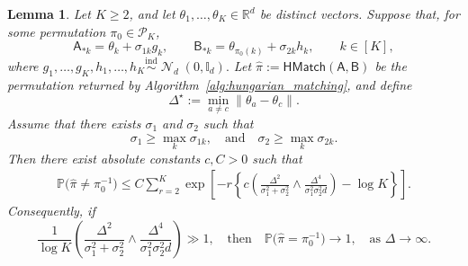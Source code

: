 \documentclass[10pt]{article}
\newtheorem{lemma}{Lemma}
\newcommand{\R}{\mathbb R}
\newcommand{\Id}{\mathbb I}
\DeclareMathOperator{\dnorm}{\mathcal N}
\newcommand{\matchmodule}{\mathsf{HMatch}}
\begin{document}
\begin{lemma} \label{lem:gaussian_hungarian_matching_unequal_noise} Let \(K\ge 2\), and let \(\theta_1,\ldots,\theta_K\in\R^d\) be distinct vectors. Suppose that, for some permutation \(\pi_0\in\mathcal P_K\), 
\[ 
\mathsf A_{*k} = \theta_k+\sigma_{1k} g_k, \qquad \mathsf B_{*k} = \theta_{\pi_0(k)}+\sigma_{2k} h_k, \qquad k\in[K], 
\] 
where $g_1,\ldots,g_K,h_1,\ldots,h_K \stackrel{\mathrm{ind}}{\sim}\dnorm_d(0,\Id_d).$
Let $\widehat\pi := \matchmodule(\mathsf A,\mathsf B)$ be the permutation returned by Algorithm~\ref{alg:hungarian_matching}, and define 
\[ 
\Delta^\star := \min_{a\neq c}\|\theta_a-\theta_c\|. 
\] 
Assume that there exists $\sigma_1$ and $\sigma_2$ such that
\[
\sigma_1 \ge \max_k \sigma_{1k}, \quad \mbox{and} \quad \sigma_2 \ge \max_k \sigma_{2k}.
\]
Then there exist absolute constants \(c,C>0\) such that 
\begin{align} 
\mathbb P\bigl(\widehat\pi\neq\pi_0^{-1}\bigr) \le C\sum_{r=2}^K \exp\left[ -r\left\{ c\left( \frac{\Delta^2}{\sigma_1^2+\sigma_2^2} \wedge \frac{\Delta^4} {\sigma_1^2\sigma_2^2d} \right) -\log K \right\} \right]. 
\end{align} 
Consequently, if 
\[ 
\frac{1}{\log K} \left( \frac{\Delta^2}{\sigma_1^2+\sigma_2^2} \wedge \frac{\Delta^4} {\sigma_1^2\sigma_2^2d} \right) \gg 1, \quad \mbox{then} \quad \mathbb P\bigl(\widehat\pi=\pi_0^{-1}\bigr) \to 1, \quad \mbox{as $\Delta \to \infty$.}
\] 
\end{lemma}
\end{document}
